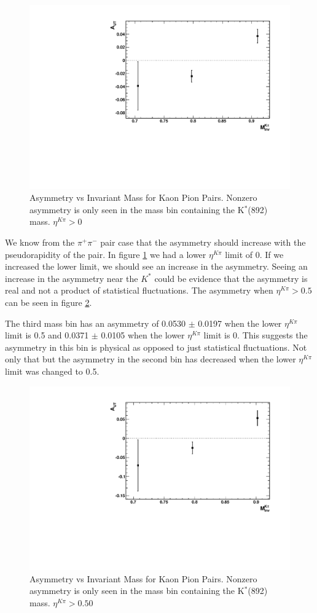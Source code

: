 \documentclass[abstract = on,listof=totoc, bibliography=totoc]{scrreprt}
\newcommand{\pip}{\pi^+}
\newcommand{\pim}{\pi^-}
\newcommand{\pair}{$\pip\pim$ }
\newcommand{\etakp}{\eta^{K\pi}}
\begin{document}
\begin{figure}
\begin{center}
\includegraphics[width = .6\textwidth]{AutVMass_KPi}
\caption[Asymmetry vs Invariant Mass for Kaon Pion Pairs]{Asymmetry vs Invariant Mass for Kaon Pion Pairs. Nonzero asymmetry is only seen in the mass bin containing the K$^*$(892) mass. $\etakp > 0$}
\label{fig:AutVMass_KPi}
\end{center}
\end{figure}


We know from the \pair pair case that the asymmetry should increase with the pseudorapidity of the pair. In figure \ref{fig:AutVMass_KPi} we had a lower $\etakp$ limit of 0. If we increased the lower limit, we should see an increase in the asymmetry. Seeing an increase in the asymmetry near the $K^*$ could be evidence that the asymmetry is real and not a product of statistical fluctuations. The asymmetry when $\etakp > 0.5$ can be seen in figure \ref{fig:AutVMass_KPi_eta050}. 

The third mass bin has an asymmetry of 0.0530 $\pm$ 0.0197 when the lower $\etakp$ limit is 0.5 and 0.0371 $\pm$ 0.0105 when the lower $\etakp$ limit is 0. This suggests the asymmetry in this bin is physical as opposed to just statistical fluctuations. Not only that but the asymmetry in the second bin has decreased when the lower $\etakp$ limit was changed to 0.5. 

\begin{figure}
\begin{center}
\includegraphics[width = .6\textwidth]{AsymVsM_eta050}
\caption[Asymmetry vs Invariant Mass for Kaon Pion Pairs]{Asymmetry vs Invariant Mass for Kaon Pion Pairs. Nonzero asymmetry is only seen in the mass bin containing the K$^*$(892) mass. $\etakp > 0.50$}
\label{fig:AutVMass_KPi_eta050}
\end{center}
\end{figure}
\end{document}

